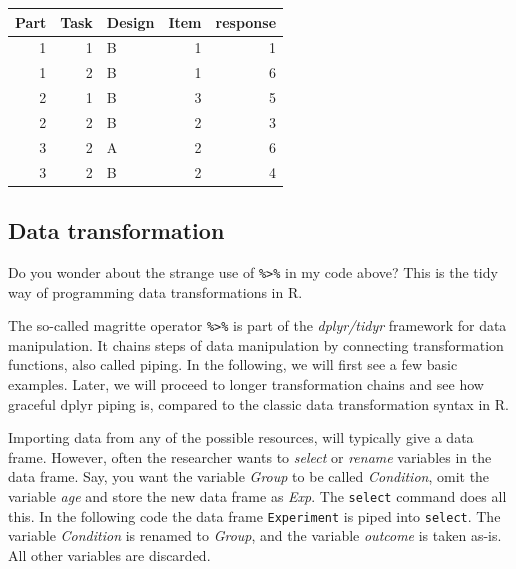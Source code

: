 \documentclass[]{svmono}
\newenvironment{Shaded}{\begin{snugshade}}{\end{snugshade}}
\newcommand{\KeywordTok}[1]{\textcolor[rgb]{0.13,0.29,0.53}{\textbf{#1}}}
\newcommand{\DecValTok}[1]{\textcolor[rgb]{0.00,0.00,0.81}{#1}}
\newcommand{\StringTok}[1]{\textcolor[rgb]{0.31,0.60,0.02}{#1}}
\newcommand{\OperatorTok}[1]{\textcolor[rgb]{0.81,0.36,0.00}{\textbf{#1}}}
\newcommand{\NormalTok}[1]{#1}
\theoremstyle{definition}
\theoremstyle{definition}
\theoremstyle{definition}
\theoremstyle{remark}
\begin{document}
\begin{Shaded}
\end{Shaded}

\begin{tabular}{r|r|l|r|r}
\hline
Part & Task & Design & Item & response\\
\hline
1 & 1 & B & 1 & 1\\
\hline
1 & 2 & B & 1 & 6\\
\hline
2 & 1 & B & 3 & 5\\
\hline
2 & 2 & B & 2 & 3\\
\hline
3 & 2 & A & 2 & 6\\
\hline
3 & 2 & B & 2 & 4\\
\hline
\end{tabular}

\subsection{Data transformation}\label{data-transformation}

Do you wonder about the strange use of \texttt{\%\textgreater{}\%} in my
code above? This is the tidy way of programming data transformations in
R.

The so-called magritte operator \texttt{\%\textgreater{}\%} is part of
the \emph{dplyr/tidyr} framework for data manipulation. It chains steps
of data manipulation by connecting transformation functions, also called
piping. In the following, we will first see a few basic examples. Later,
we will proceed to longer transformation chains and see how graceful
dplyr piping is, compared to the classic data transformation syntax in
R.

Importing data from any of the possible resources, will typically give a
data frame. However, often the researcher wants to \emph{select} or
\emph{rename} variables in the data frame. Say, you want the variable
\emph{Group} to be called \emph{Condition}, omit the variable \emph{age}
and store the new data frame as \emph{Exp}. The \texttt{select} command
does all this. In the following code the data frame \texttt{Experiment}
is piped into \texttt{select}. The variable \emph{Condition} is renamed
to \emph{Group}, and the variable \emph{outcome} is taken as-is. All
other variables are discarded.
\end{document}
